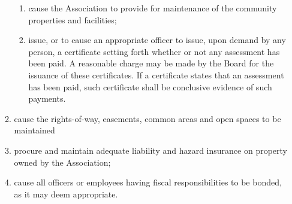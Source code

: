 \documentclass[10pt, letterpaper]{article}
\begin{document}
\begin{enumerate}
\begin{enumerate}
\begin{enumerate}
          \item cause the Association to provide for maintenance of the community properties and facilities;
          \item issue, or to cause an appropriate officer to issue, upon demand by any person, a certificate setting forth whether or not any assessment has been paid.
            A reasonable charge may be made by the Board for the issuance of these certificates.
            If a certificate states that an assessment has been paid, such certificate shall be conclusive evidence of such payments.
        \end{enumerate}
      \item cause the rights-of-way, easements, common areas and open spaces to be maintained
      \item procure and maintain adequate liability and hazard insurance on property owned by the Association;
      \item cause all officers or employees having fiscal responsibilities to be bonded, as it may deem appropriate.
    \end{enumerate}
\end{enumerate}

\end{document}
